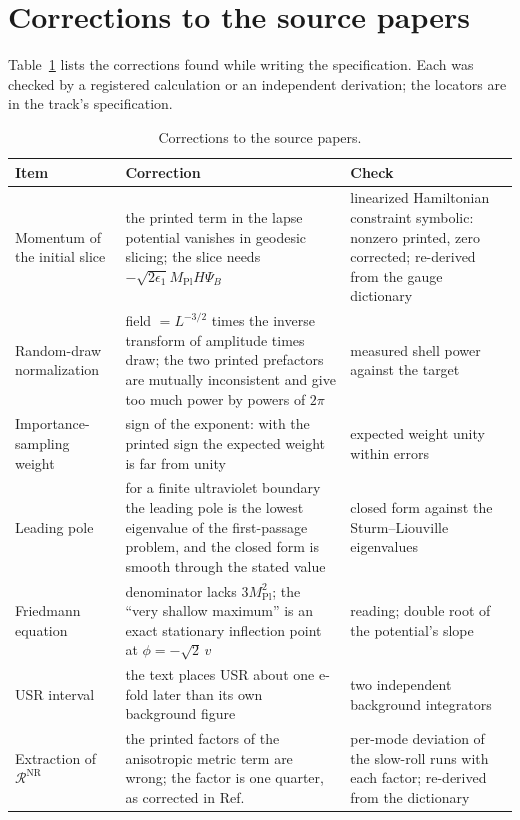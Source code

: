 \documentclass[aps,prd,twocolumn,10pt,superscriptaddress,nofootinbib,longbibliography,floatfix]{revtex4-2}
\newcommand{\Mpl}{M_\mathrm{Pl}}
\begin{document}
\section{Corrections to the source papers}\label{app:errata}

Table~\ref{tab:errata} lists the corrections found while writing the specification. Each was checked by a registered calculation or an independent derivation; the locators are in the track's specification.

\begin{table}
\caption{\label{tab:errata}Corrections to the source papers.}
\begin{ruledtabular}
\footnotesize
\begin{tabular}{p{}p{}p{}}
Item & Correction & Check \\
\hline
Momentum of the initial slice \cite{Launay:2025bd} & the printed term in the lapse potential vanishes in geodesic slicing; the slice needs $-\sqrt{2\epsilon_1}\Mpl H\Psi_B$ & linearized Hamiltonian constraint symbolic: nonzero printed, zero corrected; re-derived from the gauge dictionary \\
Random-draw normalization \cite{Launay:2025bd,Launay:2026thesis} & field $=L^{-3/2}$ times the inverse transform of amplitude times draw; the two printed prefactors are mutually inconsistent and give too much power by powers of $2\pi$ & measured shell power against the target \\
Importance-sampling weight \cite{Jackson:2022is} & sign of the exponent: with the printed sign the expected weight is far from unity & expected weight unity within errors \\
Leading pole \cite{Jackson:2022is} & for a finite ultraviolet boundary the leading pole is the lowest eigenvalue of the first-passage problem, and the closed form is smooth through the stated value & closed form against the Sturm--Liouville eigenvalues \\
Friedmann equation \cite{Launay:2025sinr} & denominator lacks $3\Mpl^2$; the ``very shallow maximum'' is an exact stationary inflection point at $\phi=-\sqrt2\,v$ & reading; double root of the potential's slope \\
USR interval \cite{Launay:2025sinr} & the text places USR about one e-fold later than its own background figure & two independent background integrators \\
Extraction of $\mathcal{R}^\mathrm{NR}$ \cite{Launay:2025bd} & the printed factors of the anisotropic metric term are wrong; the factor is one quarter, as corrected in Ref.~\cite{Launay:2026thesis} & per-mode deviation of the slow-roll runs with each factor; re-derived from the dictionary \\
\end{tabular}
\end{ruledtabular}
\end{table}
\end{document}
